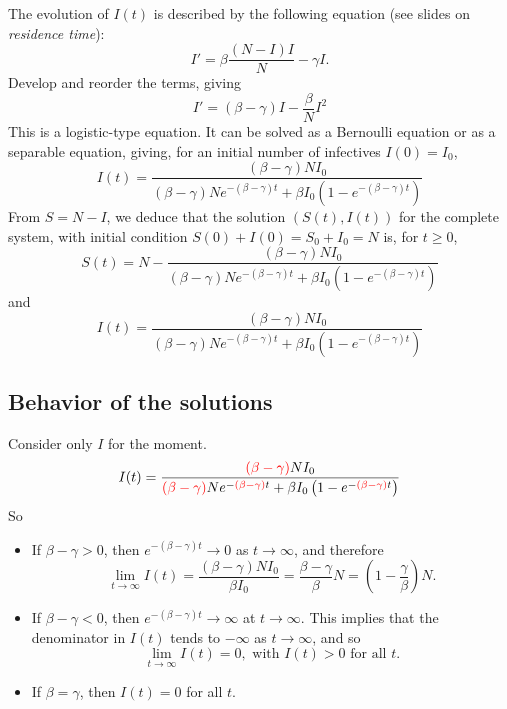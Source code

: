 The evolution of $I(t)$ is described by the following equation (see slides on \emph{residence time}):
\[
I'= \beta \frac{(N-I)I}{N}-\gamma I.
\]
Develop and reorder the terms, giving
\begin{equation}\label{sys:I_nodemography}
I'=(\beta-\gamma)I-\frac{\beta}{N} I^2
\end{equation}
This is a logistic-type equation. It can be solved as a Bernoulli equation or as a separable equation, giving, for an initial number of infectives $I(0)=I_0$,
\[
I(t)=\frac{(\beta-\gamma)NI_0}{(\beta-\gamma)Ne^{-(\beta-\gamma)t}+\beta I_0\left(1-e^{-(\beta-\gamma)t}\right)}
\]
From $S=N-I$, we deduce that the solution $(S(t),I(t))$ for the complete system, with initial condition $S(0)+I(0)=S_0+I_0=N$ is, for $t\geq 0$,
\[
S(t)=N-\frac{(\beta-\gamma)NI_0}{(\beta-\gamma)Ne^{-(\beta-\gamma)t}+\beta I_0\left(1-e^{-(\beta-\gamma)t}\right)}
\]
and 
\[
I(t)=\frac{(\beta-\gamma)NI_0}{(\beta-\gamma)Ne^{-(\beta-\gamma)t}+\beta I_0\left(1-e^{-(\beta-\gamma)t}\right)}
\]


\subsection{Behavior of the solutions}
Consider only $I$ for the moment.
\[
I(t)=\frac{{\red(\beta-\gamma)}NI_0}{{\red(\beta-\gamma)}Ne^{-{\red(\beta-\gamma)}t}+\beta I_0\left(1-e^{-{\red(\beta-\gamma)}t}\right)}
\]
So
\begin{itemize}
\item If $\beta-\gamma>0$, then $e^{-(\beta-\gamma)t}\to 0$ as $t\to\infty$, and therefore
\[
\lim_{t\to\infty} I(t)=\frac{(\beta-\gamma)NI_0}{\beta I_0}=\frac{\beta-\gamma}{\beta}N=\left(1-\frac{\gamma}{\beta}\right)N.
\]
\item If $\beta-\gamma<0$, then $e^{-(\beta-\gamma)t}\to\infty$ at $t\to\infty$. This implies that the denominator in $I(t)$ tends to $-\infty$ as $t\to\infty$, and so
\[
\lim_{t\to\infty} I(t)=0,\textrm{ with }I(t)>0\textrm{ for all }t.
\]
\item If $\beta=\gamma$, then $I(t)=0$ for all $t$.
\end{itemize}


